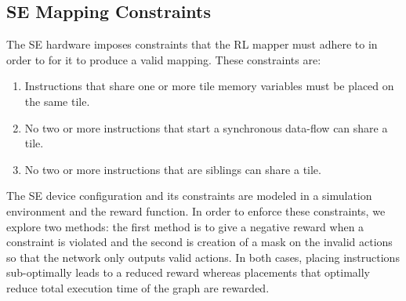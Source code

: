 \subsection{SE Mapping Constraints}
The SE hardware imposes constraints that the RL mapper must adhere to in order to for it to produce a valid mapping. These constraints are:
\begin{enumerate}
  \item Instructions that share one or more tile memory variables must be placed on the same tile.
  \item No two or more instructions that start a synchronous data-flow can share a tile.
  \item No two or more instructions that are siblings can share a tile.
\end{enumerate}
The SE device configuration and its constraints are modeled in a simulation environment and the reward function.
In order to enforce these constraints, we explore two methods: the first method is to give a negative reward when a 
constraint is violated and the second is creation of a mask on the invalid actions so that the network only outputs valid actions.
In both cases, placing instructions sub-optimally leads to a reduced reward whereas placements that optimally reduce total execution time of the graph are rewarded. 